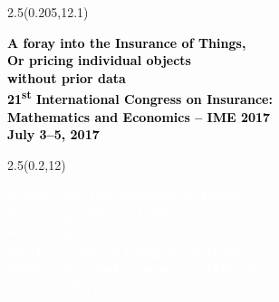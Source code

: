 \begin{frame}[plain]
  \begin{textblock*}{2.5\TPHorizModule}(0.205\TPHorizModule,12.1\TPVertModule)
    \raggedright%
    \bfseries
    \fontsize{20}{20}\selectfont
    \textcolor{black}{%
      A foray into the Insurance of Things, \\
      Or pricing individual objects \\
      without prior data} \\
    \mdseries
    \fontsize{12}{13}\selectfont
    \textcolor{black}{%
      21\textsuperscript{st} International Congress on
      Insurance: \\ Mathematics and Economics -- IME 2017 \\
      July 3--5, 2017}
  \end{textblock*}
  \begin{textblock*}{2.5\TPHorizModule}(0.2\TPHorizModule,12\TPVertModule)
    \raggedright%
    \bfseries
    \fontsize{20}{20}\selectfont
    \textcolor{white}{%
      A foray into the Insurance of Things, \\
      Or pricing individual objects \\
      without prior data} \\
    \mdseries
    \fontsize{12}{13}\selectfont
    \textcolor{white}{%
      21\textsuperscript{st} International Congress on
      Insurance: \\ Mathematics and Economics -- IME 2017 \\
      July 3--5, 2017}
  \end{textblock*}
\end{frame}
\endgroup

